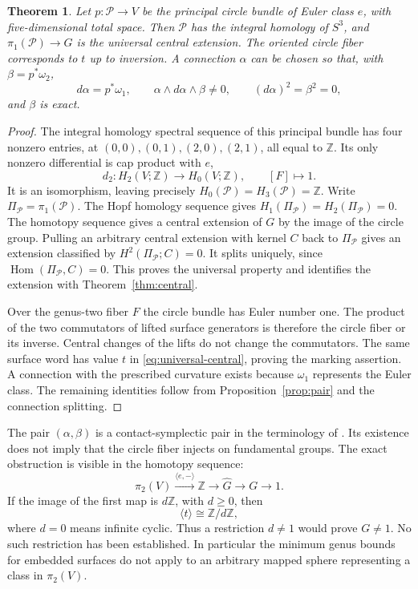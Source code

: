 \documentclass[11pt]{amsart}
\newtheorem{theorem}{Theorem}[section]
\theoremstyle{definition}
\theoremstyle{remark}
\newcommand{\Z}{\mathbb Z}
\begin{document}
\begin{theorem}\label{thm:circle}
Let $p:\mathcal P\to V$ be the principal circle bundle of Euler
class $e$, with five-dimensional total space. Then $\mathcal P$ has the integral homology of $S^3$,
and $\pi_1(\mathcal P)\to G$ is the universal central extension.
The oriented circle fiber corresponds to $t$ up to inversion.
A connection $\alpha$ can be chosen so that, with
$\beta=p^*\omega_2$,
\[
 d\alpha=p^*\omega_1,\qquad
 \alpha\wedge d\alpha\wedge\beta\ne0,
 \qquad (d\alpha)^2=\beta^2=0,
\]
and $\beta$ is exact.
\end{theorem}
\begin{proof}
The integral homology spectral sequence of this principal bundle has
four nonzero entries, at $(0,0),(0,1),(2,0),(2,1)$, all equal to
$\Z$. Its only nonzero differential is cap product with $e$,
\[
 d_2:H_2(V;\Z)\longrightarrow H_0(V;\Z),\qquad [F]\longmapsto1.
\]
It is an isomorphism, leaving precisely $H_0(\mathcal P)=
H_3(\mathcal P)=\Z$. Write $\Pi_{\mathcal P}=\pi_1(\mathcal P)$.
The Hopf homology sequence gives $H_1(\Pi_{\mathcal P})=
H_2(\Pi_{\mathcal P})=0$. The homotopy sequence gives a central
extension of $G$ by the image of the circle group. Pulling an arbitrary
central extension with kernel $C$ back to $\Pi_{\mathcal P}$ gives
an extension classified by $H^2(\Pi_{\mathcal P};C)=0$.
It splits uniquely, since $\operatorname{Hom}(\Pi_{\mathcal P},C)=0$.
This proves the universal property and identifies the extension with
Theorem~\ref{thm:central}.

Over the genus-two fiber $F$ the circle bundle has Euler number one.
The product of the two commutators of lifted surface generators is
therefore the circle fiber or its inverse. Central changes of the
lifts do not change the commutators. The same surface word has value
$t$ in \eqref{eq:universal-central}, proving the marking assertion.
A connection with the prescribed curvature exists because $\omega_1$
represents the Euler class. The remaining identities follow from
Proposition~\ref{prop:pair} and the connection splitting.
\end{proof}

The pair $(\alpha,\beta)$ is a contact-symplectic pair in the
terminology of \cite{BK06}. Its existence does not imply that the
circle fiber injects on fundamental groups. The exact obstruction is
visible in the homotopy sequence:
\begin{equation}\label{eq:spherical-periods}
 \pi_2(V)\xrightarrow{\langle e,-\rangle}\Z
 \longrightarrow\widehat G\longrightarrow G\longrightarrow1.
\end{equation}
If the image of the first map is $d\Z$, with $d\ge0$, then
\begin{equation}\label{eq:order-t}
                 \langle t\rangle\cong\Z/d\Z,
\end{equation}
where $d=0$ means infinite cyclic. Thus a restriction $d\ne1$
would prove $G\ne1$. No such restriction has been established.
In particular the minimum genus bounds for embedded surfaces do not
apply to an arbitrary mapped sphere representing a class in $\pi_2(V)$.
\end{document}
